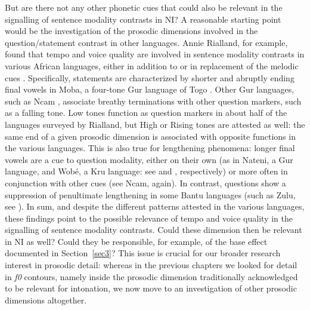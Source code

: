 But are there not any other phonetic cues that could also be relevant in the signalling of sentence modality contrasts in NI? A reasonable starting point would be the investigation of the prosodic dimensions involved in the question/statement contrast in other languages. Annie Rialland, for example, found that tempo and voice quality are involved in sentence modality contrasts in various African languages, either in addition to or in replacement of the melodic cues \citep{rialland2007question}. Specifically, statements are characterized by shorter and abruptly ending final vowels in Moba, a four-tone Gur language of Togo \citep{rialland1984fini}. Other Gur languages, such as Ncam \citep{podi1995esquisse}, associate breathy terminations with other question markers, such as a falling tone. Low tones function as question markers in about half of the languages surveyed by Rialland, but High or Rising tones are attested as well: the same end of a given prosodic dimension is associated with opposite functions in the various languages. This is also true for lengthening phenomena: longer final vowels are a cue to question modality, either on their own (as in Nateni, a Gur language, and Wobé, a Kru language: see \citealt{neukom1995description} and \citealt{marchese1978atlas}, respectively) or more often in conjunction with other cues (see Ncam, again). In contrast, questions show a suppression of penultimate lengthening in some Bantu languages (such as Zulu, see \citealt{taljaard1988handbook}). In sum, and despite the different patterns attested in the various languages, these findings point to the possible relevance of tempo and voice quality in the signalling of sentence modality contrasts. Could these dimension then be relevant in NI as well? Could they be responsible, for example, of the base effect documented in Section~\ref{sec3}? This issue is crucial for our broader research interest in prosodic detail: whereas in the previous chapters we looked for detail in \textit{f0} contours, namely inside the prosodic dimension traditionally acknowledged to be relevant for intonation, we now move to an investigation of other prosodic dimensions altogether.

